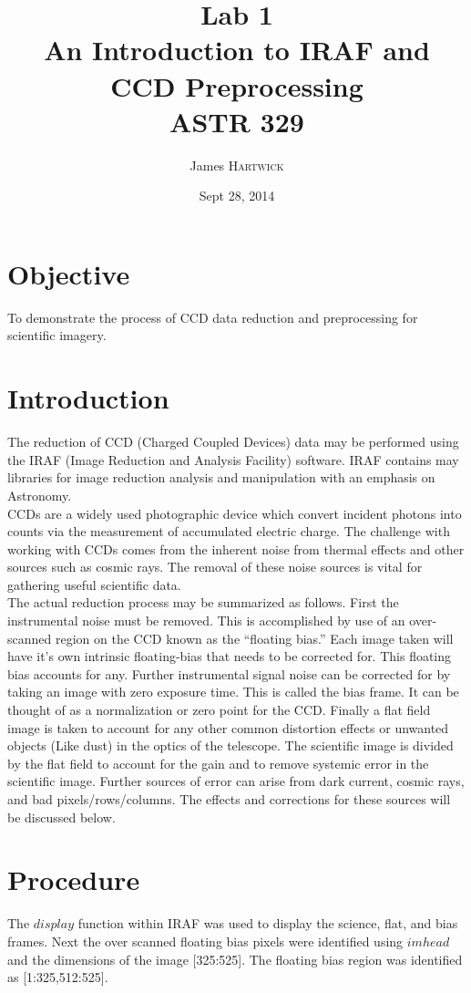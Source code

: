 \documentclass{article}
\title{Lab 1 \\ An Introduction to IRAF and CCD Preprocessing \\ ASTR 329} %
\author{James \textsc{Hartwick}} %
\date{Sept 28, 2014} %
\begin{document}
\maketitle %



\section{Objective}
To demonstrate the process of CCD data reduction and preprocessing for scientific imagery.
\section{Introduction}
The reduction of CCD (Charged Coupled Devices) data may be performed using the IRAF (Image Reduction and Analysis Facility) software. IRAF contains may libraries for image reduction analysis and manipulation with an emphasis on Astronomy.\\

CCDs are a widely used photographic device which convert incident photons into counts via the measurement of accumulated electric charge. The challenge with working with CCDs comes from the inherent noise from thermal effects and other sources such as cosmic rays. The removal of these noise sources is vital for gathering useful scientific data.\\

The actual reduction process may be summarized as follows. First the instrumental noise must be removed. This is accomplished by use of an over-scanned region on the CCD known as the “floating bias.” Each image taken will have it's own intrinsic floating-bias that needs to be corrected for. This floating bias accounts for any. Further instrumental signal noise can be corrected for by taking an image with zero exposure time. This is called the bias frame. It can be thought of as a normalization or zero point for the CCD. Finally a flat field image is taken to account for any other common distortion effects or unwanted objects (Like dust) in the optics of the telescope. The scientific image is divided by the flat field to account for the gain and to remove systemic error in the scientific image. Further sources of error can arise from dark current, cosmic rays, and bad pixels/rows/columns. The effects and corrections for these sources will be discussed below.
\section{Procedure}
The $display$ function within IRAF was used to display the science, flat, and bias frames. Next the over scanned floating bias pixels were identified using $imhead$ and the dimensions of the image [325:525]. The floating bias region was identified as [1:325,512:525].\\
\end{document}
